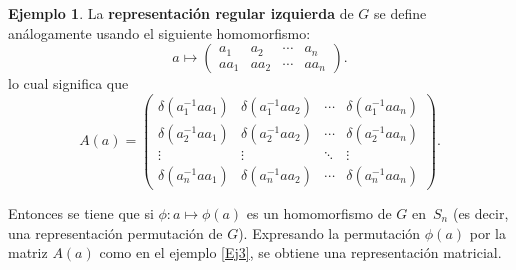 \documentclass[12pt]{book}
\theoremstyle{definition}
\newtheorem{example}[theorem]{Ejemplo}
\newcounter{in}
\begin{document}
\begin{example}
  La \textbf{representación regular izquierda} de $G$ se define
análogamente usando el siguiente homomorfismo:
  \begin{equation*}
    a \mapsto
    \begin{pmatrix}
      a_{1} & a_{2} & \cdots  & a_{n}\\ 
      aa_{1} & aa_{2} & \cdots & aa_{n}
    \end{pmatrix}.
  \end{equation*}
  lo cual significa que
  \begin{equation}
    \label{eq:8}
    A\left(a\right) = 
    \begin{pmatrix}
      \delta\left(a_{1}^{-1}aa_{1}\right) & \delta\left(a_{1}^{-1}aa_{2}\right) & \cdots  & \delta\left(a_{1}^{-1}aa_{n}\right)\\
      \delta\left(a_{2}^{-1}aa_{1}\right) & \delta\left(a_{2}^{-1}aa_{2}\right) & \cdots  & \delta\left(a_{2}^{-1}aa_{n}\right)\\ 
      \vdots & \vdots & \ddots & \vdots\\
      \delta\left(a_{n}^{-1}aa_{1}\right) & \delta\left(a_{n}^{-1}aa_{2}\right) & \cdots  & \delta\left(a_{n}^{-1}aa_{n}\right)
    \end{pmatrix}
    .
  \end{equation}
\end{example}

Entonces se tiene que si $\phi \colon a \mapsto \phi\left(a\right)$ es
un homomorfismo de $G$ en~$S_{n}$ (es decir, una representación
permutación de $G$). Expresando la permutación $\phi\left(a\right)$
por la matriz $A\left(a\right)$ como en el ejemplo \ref{Ej3}, se
obtiene una representación matricial.
\end{document}
